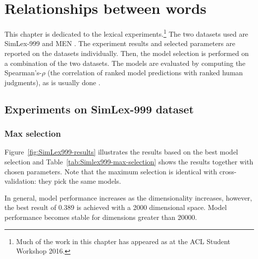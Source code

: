 \chapter{Relationships between words}
\label{sec:lexical}

This chapter is dedicated to the lexical experiments.\footnote{Much of the work in this chapter has appeared as  at the ACL Student Workshop 2016.} The two datasets used are  SimLex-999 \cite{hill2014simlex} and MEN \cite{Bruni:2014:MDS:2655713.2655714}.
The experiment results and selected parameters are reported on the datasets individually. Then, the model selection is performed on a combination of the two datasets. The models are evaluated by computing the Spearman's-$\rho$ (the correlation of ranked model predictions with ranked human judgments), as is usually done \cite{Bruni:2014:MDS:2655713.2655714,hill2014simlex}.\footnotemark{}


\section{Experiments on SimLex-999 dataset}
\label{sec:simlex-999}



\subsection{Max selection}
\label{sec:max-selection-simlex}


%
%
%

Figure~\ref{fig:SimLex999-results} illustrates the results based on the best model selection and Table~\ref{tab:Simlex999-max-selection} shows the results together with chosen parameters. Note that the maximum selection is identical with cross-validation: they pick the same models.

In general, model performance increases as the dimensionality increases, however, the best result of 0.389 is achieved with a 2000 dimensional space. Model performance becomes stable for dimensions greater than 20000.

